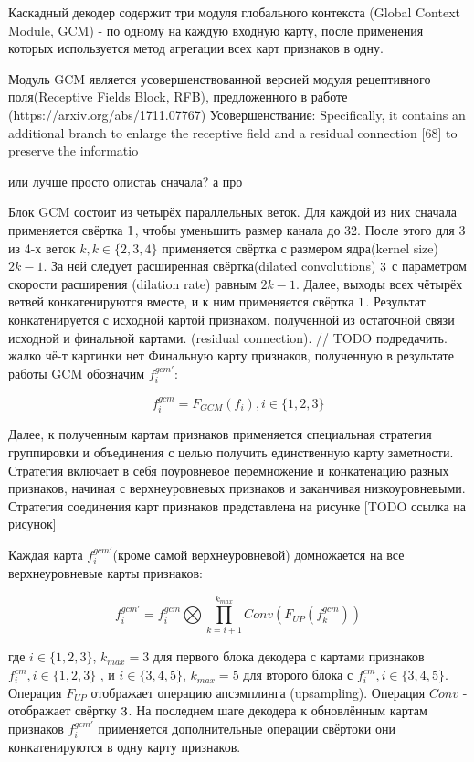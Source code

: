 Каскадный декодер содержит три модуля глобального контекста (Global Context Module, GCM) - по одному на каждую входную карту, после применения которых
используется метод агрегации всех карт признаков в одну. 

Модуль GCM является усовершенствованной версией модуля рецептивного поля(Receptive Fields Block, RFB), предложенного в работе \cite{RFB} (https://arxiv.org/abs/1711.07767)
Усовершенствание: 
Specifically, it contains an additional branch to enlarge the
receptive field and a residual connection [68] to preserve the
informatio

или лучше просто опистаь сначала? а про

Блок GCM состоит из четырёх параллельных веток. Для каждой из них сначала применяется свёртка $1 \time 1$, чтобы уменьшить размер 
канала до 32. После этого для 3 из 4-х веток $k, k \in \{2,3,4\}$ применяется свёртка с размером ядра(kernel size) $2k-1$. За ней 
следует расширенная свёртка(dilated convolutions) $3 \time 3$ с параметром скорости расширения (dilation rate) равным $2k-1$.
Далее, выходы всех чётырёх ветвей конкатенируются вместе, и к ним применяется свёртка $1 \time 1$. 
Результат конкатенируется с исходной картой признаком, полученной из остаточной связи исходной и финальной картами. (residual connection). // TODO подредачить. жалко чё-т картинки нет
Финальную карту признаков, полученную в результате работы GCM обозначим $f_i^{gcm'}$:

\begin{equation}
    f_i^{gcm} = F_{GCM}(f_i), i \in \{1,2,3\}
\end{equation}

Далее, к полученным картам признаков применяется специальная стратегия группировки и объединения с целью получить единственную
карту заметности. Стратегия включает в себя  поуровневое перемножение и конкатенацию разных признаков, начиная с верхнеуровневых признаков
и заканчивая низкоуровневыми. Стратегия соединения карт признаков представлена на рисунке [TODO ссылка на рисунок]

Каждая карта $f_i^{gcm'}$(кроме самой верхнеуровневой) домножается на все верхнеуровневые карты признаков:

\begin{equation}
    f_i^{gcm'} = f_i^{gcm} \bigotimes \prod_{k=i+1}^{k_{max}}Conv(F_{UP}(f_k^{gcm}))
\end{equation}

где $i \in \{1,2,3\}$, $k_{max}=3$ для первого блока декодера с картами признаков $f_i^{cm}, i \in \{1,2,3\}$ , и
$i \in \{3,4,5\}$, $k_{max}=5$ для второго блока с $f_i^{cm}, i \in \{3,4,5\}$. Операция $F_{UP}$ отображает
операцию апсэмплинга (upsampling). Операция $Conv$ - отображает свёртку $3 \time 3$.
На последнем шаге декодера к обновлённым картам признаков $f_i^{gcm'}$  применяется дополнительные операции свёртоки они конкатенируются
в одну карту признаков. 

